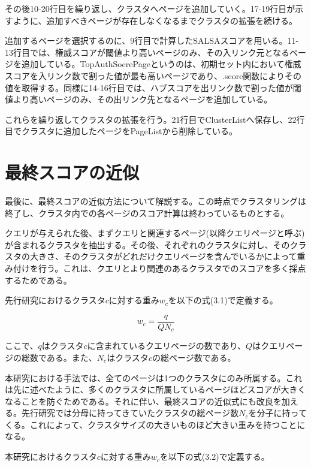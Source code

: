 \documentclass[a4paper,11pt]{jreport}
\begin{document}
その後10-20行目を繰り返し、クラスタへページを追加していく。17-19行目が示すように、追加すべきページが存在しなくなるまでクラスタの拡張を続ける。

追加するページを選択するのに、9行目で計算したSALSAスコアを用いる。11-13行目では、権威スコアが閾値より高いページのみ、その入リンク元となるページを追加している。TopAuthSocrePageというのは、初期セット内において権威スコアを入リンク数で割った値が最も高いページであり、.score関数によりその値を取得する。同様に14-16行目では、ハブスコアを出リンク数で割った値が閾値より高いページのみ、その出リンク先となるページを追加している。

これらを繰り返してクラスタの拡張を行う。21行目でClusterListへ保存し、22行目でクラスタに追加したページをPageListから削除している。

\newpage

\section{最終スコアの近似}

最後に、最終スコアの近似方法について解説する。この時点でクラスタリングは終了し、クラスタ内での各ページのスコア計算は終わっているものとする。

クエリが与えられた後、まずクエリと関連するページ(以降クエリページと呼ぶ)が含まれるクラスタを抽出する。その後、それぞれのクラスタに対し、そのクラスタの大きさ、そのクラスタがどれだけクエリページを含んでいるかによって重み付けを行う。これは、クエリとより関連のあるクラスタでのスコアを多く採点するためである。

先行研究におけるクラスタ$c$に対する重み$w_c$を以下の式(3.1)で定義する。

\begin{equation}
w_c = \frac{q}{QN_c}
\end{equation}

ここで、$q$はクラスタ$c$に含まれているクエリページの数であり、$Q$はクエリページの総数である。また、$N_c$はクラスタ$c$の総ページ数である。

本研究における手法では、全てのページは1つのクラスタにのみ所属する。これは先に述べたように、多くのクラスタに所属しているページほどスコアが大きくなることを防ぐためである。それに伴い、最終スコアの近似式にも改良を加える。先行研究では分母に持ってきていたクラスタの総ページ数$N_c$を分子に持ってくる。これによって、クラスタサイズの大きいものほど大きい重みを持つことになる。

本研究におけるクラスタ$c$に対する重み$w_c$を以下の式(3.2)で定義する。
\end{document}
